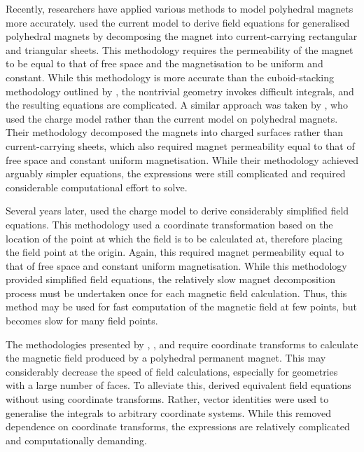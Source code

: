 Recently, researchers have applied various methods to model polyhedral magnets more accurately. \textcite{Compter2010} used the current model to derive field equations for generalised polyhedral magnets by decomposing the magnet into current-carrying rectangular and triangular sheets. This methodology requires the permeability of the magnet to be equal to that of free space and the magnetisation to be uniform and constant. While this methodology is more accurate than the cuboid-stacking methodology outlined by \textcite{Bancel1999}, the nontrivial geometry invokes difficult integrals, and the resulting equations are complicated. A similar approach was taken by \textcite{Janssen2009,Janssen2010a}, who used the charge model rather than the current model on polyhedral magnets. Their methodology decomposed the magnets into charged surfaces rather than current-carrying sheets, which also required magnet permeability equal to that of free space and constant uniform magnetisation. While their methodology achieved arguably simpler equations, the expressions were still complicated and required considerable computational effort to solve.

Several years later, \textcite{Rubeck2013} used the charge model to derive considerably simplified field equations. This methodology used a coordinate transformation based on the location of the point at which the field is to be calculated at, therefore placing the field point at the origin. Again, this required magnet permeability equal to that of free space and constant uniform magnetisation. While this methodology provided simplified field equations, the relatively slow magnet decomposition process must be undertaken once for each magnetic field calculation. Thus, this method may be used for fast computation of the magnetic field at few points, but becomes slow for many field points.

The methodologies presented by \textcite{Compter2010}, \textcite{Janssen2009,Janssen2010a}, and \textcite{Rubeck2013} require coordinate transforms to calculate the magnetic field produced by a polyhedral permanent magnet. This may considerably decrease the speed of field calculations, especially for geometries with a large number of faces. To alleviate this, \textcite{Fabbri2008} derived equivalent field equations without using coordinate transforms. Rather, vector identities were used to generalise the integrals to arbitrary coordinate systems. While this removed dependence on coordinate transforms, the expressions are relatively complicated and computationally demanding.


